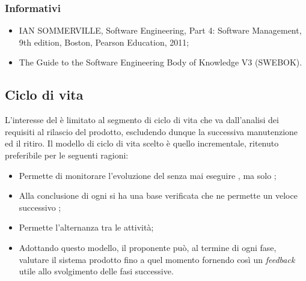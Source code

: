 \subsubsection{Informativi}
\begin{itemize}
\item IAN SOMMERVILLE, Software Engineering, Part 4: Software Management, 9th edition, Boston, Pearson Education, 2011;
\item The Guide to the Software Engineering Body of Knowledge V3 (SWEBOK).
\end{itemize}

\subsection{Ciclo di vita}
L’interesse del  è limitato al segmento di ciclo di vita che va dall’analisi dei requisiti al
rilascio del prodotto, escludendo dunque la successiva manutenzione ed il ritiro. Il modello di ciclo di
vita scelto \`e quello incrementale, ritenuto preferibile per le seguenti ragioni:
\begin{itemize}
\item Permette di monitorare l'evoluzione del  senza mai eseguire , ma solo ;
\item Alla conclusione di ogni  si ha una base verificata che ne permette un veloce successivo ;
\item Permette l'alternanza tra le attivit\`a;
\item Adottando questo modello, il proponente può, al termine di ogni fase, valutare
      il sistema prodotto fino a quel momento fornendo così un \textit{feedback} utile allo svolgimento
      delle fasi successive. 
\end{itemize}

